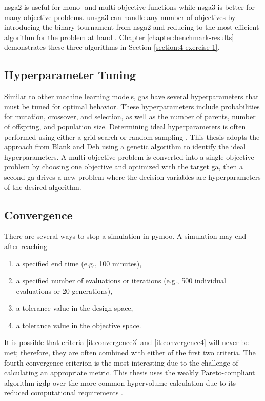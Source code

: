 \ac{nsga2} is useful for mono- and multi-objective functions while \ac{nsga3} is
better for many-objective problems. \ac{unsga3} can handle any number of
objectives by introducing the binary tournament from \ac{nsga2} and reducing to
the most efficient algorithm for the problem at hand \cite{seada_unified_2016}.
Chapter \ref{chapter:benchmark-results} demonstrates these three algorithms in 
Section \ref{section:4-exercise-1}.

\subsection{Hyperparameter Tuning}
Similar to other machine learning models, \acp{ga} have several hyperparameters
that must be tuned for optimal behavior. These hyperparameters include
probabilities for mutation, crossover, and selection, as well as the number of
parents, number of offspring, and population size. Determining ideal
hyperparameters is often performed using either a grid search or random sampling
\cite{bergstra_random_2012}. This thesis adopts the approach from Blank and Deb
\cite{blank_pymoo_2020} using a genetic algorithm to identify the ideal
hyperparameters. A multi-objective problem is converted into a single objective problem 
by choosing one objective and optimized with the target \ac{ga}, then a second \ac{ga} 
drives a new problem where the decision variables are hyperparameters of the desired algorithm.

\subsection{Convergence}
There are several ways to stop a simulation in \ac{pymoo}. A simulation may end
after reaching
\begin{enumerate}
    \item a specified end time (e.g., 100 minutes),
    \label{it:convergence1}
    \item a specified number of evaluations or iterations (e.g., 500 individual
    evaluations or 20 generations),
    \label{it:convergence2}
    \item a tolerance value in the design space,
    \label{it:convergence3}    
    \item a tolerance value in the objective space.
    \label{it:convergence4}
\end{enumerate}

It is possible that criteria \ref{it:convergence3} and \ref{it:convergence4}
will never be met; therefore, they are often combined with either of the first
two criteria. The fourth convergence criterion is the most interesting due to
the challenge of calculating an appropriate metric. This thesis uses the weakly
Pareto-compliant algorithm \ac{igdp} over the more common hypervolume
calculation due to its reduced computational requirements
\cite{ishibuchi_modified_2015}.

